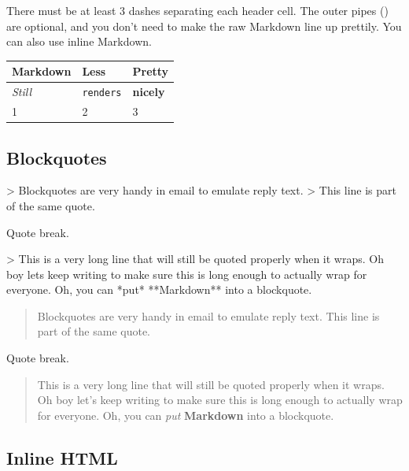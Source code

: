 \documentclass[
]{article}
\newenvironment{Shaded}{}{}
\newcommand{\NormalTok}[1]{#1}
\begin{document}
There must be at least 3 dashes separating each header cell. The outer
pipes (\textbar) are optional, and you don't need to make the raw
Markdown line up prettily. You can also use inline Markdown.

\begin{longtable}[]{@{}lll@{}}
\toprule\noalign{}
Markdown & Less & Pretty \\
\midrule\noalign{}
\endhead
\bottomrule\noalign{}
\endlastfoot
\emph{Still} & \texttt{renders} & \textbf{nicely} \\
1 & 2 & 3 \\
\end{longtable}

\subsection{Blockquotes}\label{blockquotes}

\begin{Shaded}
\begin{Highlighting}[]
\NormalTok{\textgreater{} Blockquotes are very handy in email to emulate reply text.}
\NormalTok{\textgreater{} This line is part of the same quote.}

\NormalTok{Quote break.}

\NormalTok{\textgreater{} This is a very long line that will still be quoted properly when it wraps. Oh boy let\textquotesingle{}s keep writing to make sure this is long enough to actually wrap for everyone. Oh, you can *put* **Markdown** into a blockquote.}
\end{Highlighting}
\end{Shaded}

\begin{quote}
Blockquotes are very handy in email to emulate reply text. This line is
part of the same quote.
\end{quote}

Quote break.

\begin{quote}
This is a very long line that will still be quoted properly when it
wraps. Oh boy let's keep writing to make sure this is long enough to
actually wrap for everyone. Oh, you can \emph{put} \textbf{Markdown}
into a blockquote.
\end{quote}

\subsection{Inline HTML}\label{inline-html}
\end{document}
